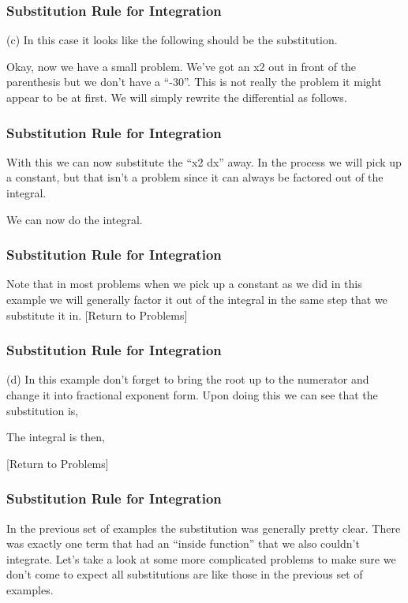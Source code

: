 \documentclass{beamer}
\begin{document}
\begin{frame}
	\frametitle{Substitution Rule for Integration}
	\large
(c) 
In this case it looks like the following should be the substitution.
                                           
Okay, now we have a small problem.  We’ve got an x2 out in front of the parenthesis but we don’t have a “-30”.  This is not really the problem it might appear to be at first.  We will simply rewrite the differential as follows.
\end{frame}
\begin{frame}
	\frametitle{Substitution Rule for Integration}
	\large                                                  
With this we can now substitute the “x2 dx” away.  In the process we will pick up a constant, but that isn’t a problem since it can always be factored out of the integral.
 
We can now do the integral.
                                        
\end{frame}
\begin{frame}
	\frametitle{Substitution Rule for Integration}
	\large
Note that in most problems when we pick up a constant as we did in this example we will generally factor it out of the integral in the same step that we substitute it in. 
[Return to Problems]
 
\end{frame}
\begin{frame}
	\frametitle{Substitution Rule for Integration}
	\large
(d) 
In this example don’t forget to bring the root up to the numerator and change it into fractional exponent form.  Upon doing this we can see that the substitution is,
                        
The integral is then,

[Return to Problems]
 
\end{frame}
\begin{frame}
	\frametitle{Substitution Rule for Integration}
	\large
In the previous set of examples the substitution was generally pretty clear.  There was exactly one term that had an “inside function” that we also couldn’t integrate.  Let’s take a look at some more complicated problems to make sure we don’t come to expect all substitutions are like those in the previous set of examples.
\end{frame}
\end{document}
